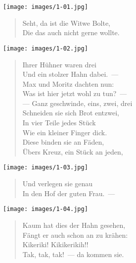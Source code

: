 \documentclass[a4paper,12pt]{article}
\begin{document}
\begin{center}\texttt{[image: images/1-01.jpg]}\end{center}



\begin{verse}
Seht, da ist die Witwe Bolte,\\{}
Die das auch nicht gerne wollte.
\end{verse}



\begin{center}\texttt{[image: images/1-02.jpg]}\end{center}



\begin{verse}
Ihrer Hühner waren drei\\{}
Und ein stolzer Hahn dabei.~—\\{}
Max und Moritz dachten nun:\\{}
Was ist hier jetzt wohl zu tun?~—\\{}
— Ganz geschwinde, eins, zwei, drei\\{}
Schneiden sie sich Brot entzwei,\\{}
In vier Teile jedes Stück\\{}
Wie ein kleiner Finger dick.\\{}
Diese binden sie an Fäden,\\{}
Übers Kreuz, ein Stück an jeden,
\end{verse}



\begin{center}\texttt{[image: images/1-03.jpg]}\end{center}



\begin{verse}
Und verlegen sie genau\\{}
In den Hof der guten Frau.~—
\end{verse}



\begin{center}\texttt{[image: images/1-04.jpg]}\end{center}



\begin{verse}
Kaum hat dies der Hahn gesehen,\\{}
Fängt er auch schon an zu krähen:\\{}
Kikeriki! Kikikerikih!!\\{}
Tak, tak, tak!~— da kommen sie.
\end{verse}
\end{document}
